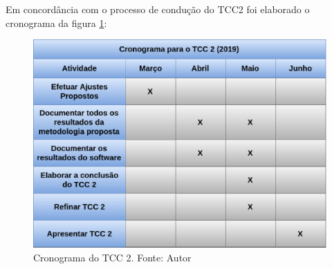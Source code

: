 Em concordância com o processo de condução do TCC2 foi elaborado o cronograma da figura \ref{fig:cronograma_tcc2}:

\begin{figure}[h!]
	\centering
  \includegraphics[keepaspectratio=true,scale=0.4]{figuras/cronograma_tcc2.eps}
  \caption[Cronograma do TCC 2.]{Cronograma do TCC 2. Fonte: Autor}
	\label{fig:cronograma_tcc2}
\end{figure}
